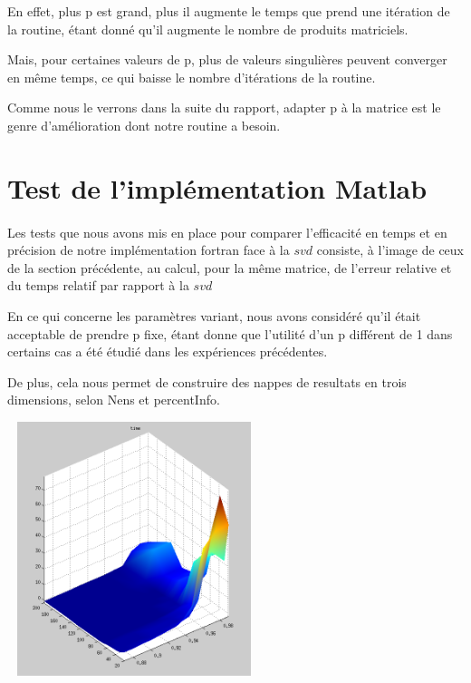 \documentclass[a4paper,12pt]{article}
\begin{document}
    En effet, plus p est grand, plus il augmente le temps
    que prend une itération de la routine, étant donné qu'il augmente le nombre
    de produits matriciels.

    Mais, pour certaines valeurs de p, plus de valeurs singulières peuvent
    converger en même temps, ce qui baisse le nombre d'itérations de la routine.

    Comme nous le verrons dans la suite du rapport, adapter p à la matrice est
    le genre d'amélioration dont notre routine a besoin.

\newpage
\section{Test de l'implémentation Matlab}

    \paragraph{}
    Les tests que nous avons mis en place pour comparer l'efficacité en temps et
    en précision de notre implémentation fortran face à la $svd$ consiste, à l'image
    de ceux de la section précédente, au calcul, pour la même matrice, de l'erreur
    relative et du temps relatif par rapport à la $svd$

    En ce qui concerne les paramètres variant, nous avons considéré qu'il était
    acceptable de prendre p fixe, étant donne que l'utilité d'un p différent de 1
    dans certains cas a été étudié dans les expériences précédentes.

    De plus, cela nous permet de construire des nappes de resultats en trois dimensions,
    selon Nens et percentInfo.

    \bigskip
    \begin{center}
    \includegraphics[width=20em, height=20em]{time1.png}
    \end{center}
\end{document}
